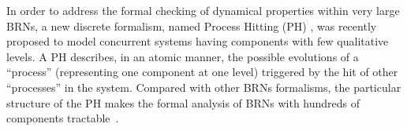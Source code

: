 


In order to address the formal checking of dynamical properties within very large BRNs, a new discrete formalism, named Process Hitting (PH) \cite{PMR10-TCSB}, was recently proposed to model concurrent systems having components with few qualitative levels. A PH describes, in an atomic manner, the possible evolutions of a ``process'' (representing one component at one level) triggered by the hit of other ``processes'' in the system. Compared with other BRNs formalisms, the particular structure of the PH makes the formal analysis of BRNs with hundreds of components tractable~\cite{PMR12-MSCS}. 

